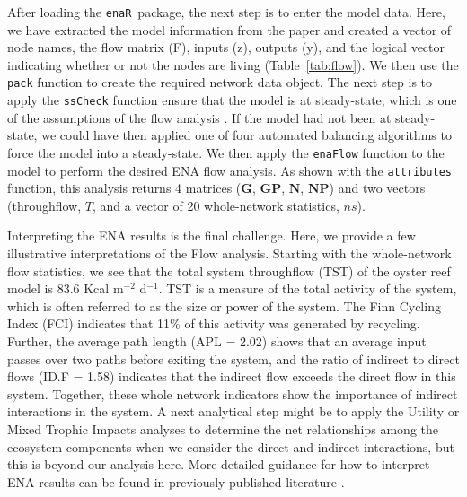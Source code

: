 \documentclass[11pt]{article}
\newcommand{\R}{R}
\newcommand{\enaR}{\texttt{enaR}}
\begin{document}
\begin{spacing}{2}
After loading the \enaR\ package, the next step is to enter the model
data.
Here, we have extracted the model information from the paper and
created a vector of node names, the flow matrix (F), inputs (z),
outputs (y), and the logical vector indicating whether or not the
nodes are living (Table~\ref{tab:flow}).  We then use the
\texttt{pack} function to create the required network data object.
The next step is to apply the \texttt{ssCheck} function ensure that
the model is at steady-state, which is one of the assumptions of the
flow analysis \citep{finn76, fath06}.  If the model had not been at
steady-state, we could have then applied one of four automated
balancing algorithms \citep[AVG, Input-Output, Output-Input,
AVG2;][]{allesina03} to force the model into a steady-state.  We then
apply the \texttt{enaFlow} function to the model to perform the
desired ENA flow analysis.  As shown with the \texttt{attributes}
function, this analysis returns 4 matrices ($\mathbf{G}$,
$\mathbf{GP}$, $\mathbf{N}$, $\mathbf{NP}$) and two vectors
(throughflow, $T$, and a vector of 20 whole-network statistics, $ns$).

Interpreting the ENA results is the final challenge.  Here, we provide
a few illustrative interpretations of the Flow analysis.  Starting
with the whole-network flow statistics, we see that the total system
throughflow (TST) of the oyster reef model is 83.6 Kcal m$^{-2}$
d$^{-1}$. TST is a measure of the total activity of the system, which
is often referred to as the size or power of the system.  The Finn
Cycling Index (FCI) indicates that 11\% of this activity was generated
by recycling.  Further, the average path length (APL = 2.02) shows
that an average input passes over two paths before exiting the system,
and the ratio of indirect to direct flows (ID.F = 1.58) indicates that
the indirect flow exceeds the direct flow in this system.  Together,
these whole network indicators show the importance of indirect
interactions in the system.  A next analytical step might be to apply
the Utility or Mixed Trophic Impacts analyses to determine the net
relationships among the ecosystem components when we consider the
direct and indirect interactions, but this is beyond our analysis here.
More detailed guidance for how to interpret ENA results can be found
in previously published literature \citep{fath06, schramski11,
  jorgensen07_newecology}.



\end{spacing}
\end{document}
